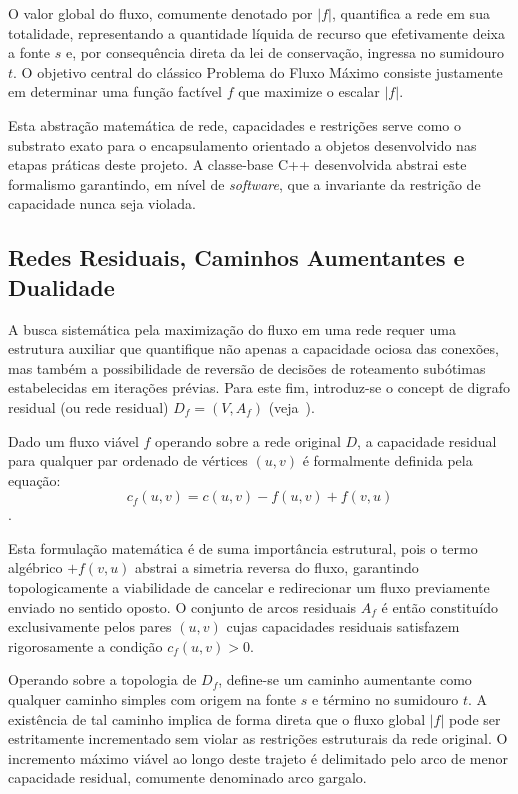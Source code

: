 \documentclass[12pt,a4paper]{article}
\begin{document}
O valor global do fluxo, comumente denotado por $|f|$, quantifica a rede em sua totalidade, representando a quantidade líquida de recurso que efetivamente deixa a fonte $s$ e, por consequência direta da lei de conservação, ingressa no sumidouro $t$. O objetivo central do clássico Problema do Fluxo Máximo consiste justamente em determinar uma função factível $f$ que maximize o escalar $|f|$.

Esta abstração matemática de rede, capacidades e restrições serve como o substrato exato para o encapsulamento orientado a objetos desenvolvido nas etapas práticas deste projeto. A classe-base C++ desenvolvida abstrai este formalismo garantindo, em nível de \textit{software}, que a invariante da restrição de capacidade nunca seja violada.

\subsection{Redes Residuais, Caminhos Aumentantes e Dualidade}

A busca sistemática pela maximização do fluxo em uma rede requer uma estrutura auxiliar que quantifique não apenas a capacidade ociosa das conexões, mas também a possibilidade de reversão de decisões de roteamento subótimas estabelecidas em iterações prévias. Para este fim, introduz-se o concept de digrafo residual (ou rede residual) $D_f = (V, A_f)$ (veja~\cite{ahuja1993network, ford1956maximal}).

Dado um fluxo viável $f$ operando sobre a rede original $D$, a capacidade residual para qualquer par ordenado de vértices $(u,v)$ é formalmente definida pela equação:
$$c_f(u,v) = c(u,v) - f(u,v) + f(v,u)$$.

Esta formulação matemática é de suma importância estrutural, pois o termo algébrico $+ f(v,u)$ abstrai a simetria reversa do fluxo, garantindo topologicamente a viabilidade de cancelar e redirecionar um fluxo previamente enviado no sentido oposto. O conjunto de arcos residuais $A_f$ é então constituído exclusivamente pelos pares $(u,v)$ cujas capacidades residuais satisfazem rigorosamente a condição $c_f(u,v) > 0$.

Operando sobre a topologia de $D_f$, define-se um caminho aumentante como qualquer caminho simples com origem na fonte $s$ e término no sumidouro $t$. A existência de tal caminho implica de forma direta que o fluxo global $|f|$ pode ser estritamente incrementado sem violar as restrições estruturais da rede original. O incremento máximo viável ao longo deste trajeto é delimitado pelo arco de menor capacidade residual, comumente denominado arco gargalo.
\end{document}
